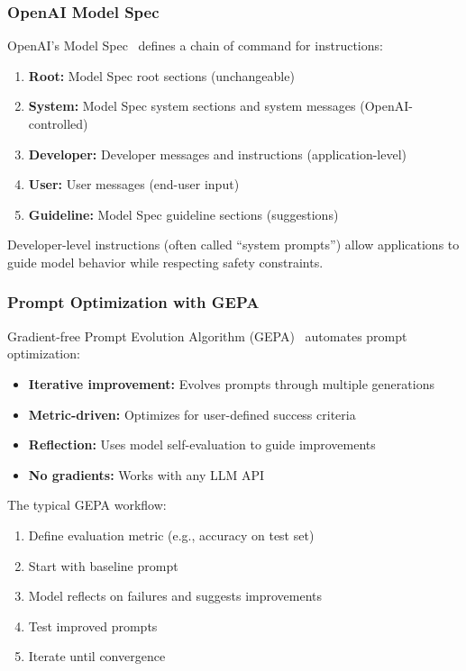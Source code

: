 \documentclass[class=article,crop=false]{standalone}
\begin{document}
\subsubsection{OpenAI Model Spec}

OpenAI's Model Spec~\cite{openai_spec} defines a chain of command for instructions:
\begin{enumerate}
  \item \textbf{Root:} Model Spec root sections (unchangeable)
  \item \textbf{System:} Model Spec system sections and system messages (OpenAI-controlled)
  \item \textbf{Developer:} Developer messages and instructions (application-level)
  \item \textbf{User:} User messages (end-user input)
  \item \textbf{Guideline:} Model Spec guideline sections (suggestions)
\end{enumerate}

Developer-level instructions (often called ``system prompts'') allow applications to guide model behavior while respecting safety constraints.

\subsubsection{Prompt Optimization with GEPA}

Gradient-free Prompt Evolution Algorithm (GEPA)~\cite{gepa} automates prompt optimization:
\begin{itemize}
  \item \textbf{Iterative improvement:} Evolves prompts through multiple generations
  \item \textbf{Metric-driven:} Optimizes for user-defined success criteria
  \item \textbf{Reflection:} Uses model self-evaluation to guide improvements
  \item \textbf{No gradients:} Works with any LLM API
\end{itemize}

The typical GEPA workflow:
\begin{enumerate}
  \item Define evaluation metric (e.g., accuracy on test set)
  \item Start with baseline prompt
  \item Model reflects on failures and suggests improvements
  \item Test improved prompts
  \item Iterate until convergence
\end{enumerate}
\end{document}
